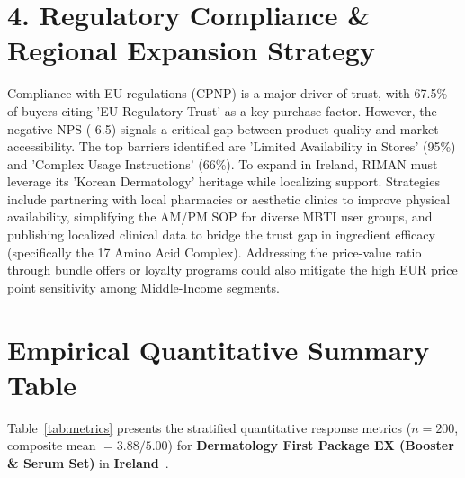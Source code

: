 \documentclass[10pt,twocolumn,a4paper]{article}
\begin{document}
\section{4. Regulatory Compliance \& Regional Expansion Strategy}
Compliance with EU regulations (CPNP) is a major driver of trust, with 67.5\% of buyers citing 'EU Regulatory Trust' as a key purchase factor. However, the negative NPS (-6.5) signals a critical gap between product quality and market accessibility. The top barriers identified are 'Limited Availability in Stores' (95\%) and 'Complex Usage Instructions' (66\%). To expand in Ireland, RIMAN must leverage its 'Korean Dermatology' heritage while localizing support. Strategies include partnering with local pharmacies or aesthetic clinics to improve physical availability, simplifying the AM/PM SOP for diverse MBTI user groups, and publishing localized clinical data to bridge the trust gap in ingredient efficacy (specifically the 17 Amino Acid Complex). Addressing the price-value ratio through bundle offers or loyalty programs could also mitigate the high EUR price point sensitivity among Middle-Income segments.


\section{Empirical Quantitative Summary Table}
Table~\ref{tab:metrics} presents the stratified quantitative response metrics ($n = 200$, composite mean $= 3.88/5.00$) for \textbf{Dermatology First Package EX (Booster \& Serum Set)} in \textbf{Ireland}~\cite{ref_kaggle_doi,ref_hf_doi}.
\end{document}
